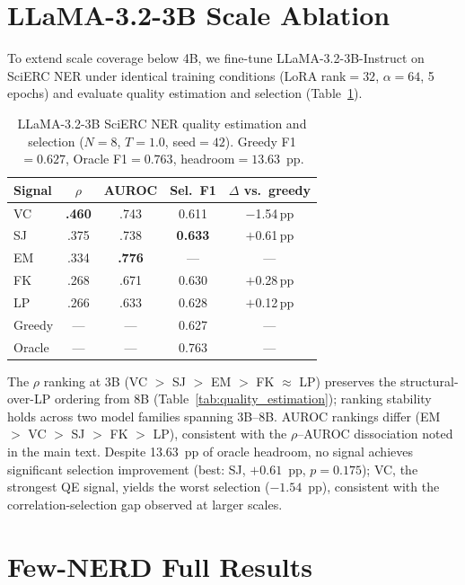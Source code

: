 \section{LLaMA-3.2-3B Scale Ablation}\label{app:llama3b}

To extend scale coverage below 4B, we fine-tune LLaMA-3.2-3B-Instruct on SciERC NER under identical training conditions (LoRA rank${=}32$, $\alpha{=}64$, 5 epochs) and evaluate quality estimation and selection (Table~\ref{tab:llama3b}).

\begin{table}[t]
\centering
\small
\caption{LLaMA-3.2-3B SciERC NER quality estimation and selection ($N{=}8$, $T{=}1.0$, seed${=}42$). Greedy F1${=}0.627$, Oracle F1${=}0.763$, headroom${=}13.63$~pp.}
\label{tab:llama3b}
\begin{tabular}{l cc cc}
\toprule
Signal & $\rho$ & AUROC & Sel.\ F1 & $\Delta$ vs.\ greedy \\
\midrule
VC & \textbf{.460} & .743 & 0.611 & $-$1.54\,pp \\
SJ & .375 & .738 & \textbf{0.633} & $+$0.61\,pp \\
EM & .334 & \textbf{.776} & --- & --- \\
FK & .268 & .671 & 0.630 & $+$0.28\,pp \\
LP & .266 & .633 & 0.628 & $+$0.12\,pp \\
\midrule
Greedy & --- & --- & 0.627 & --- \\
Oracle & --- & --- & 0.763 & --- \\
\bottomrule
\end{tabular}
\end{table}

The $\rho$ ranking at 3B (VC $>$ SJ $>$ EM $>$ FK $\approx$ LP) preserves the structural-over-LP ordering from 8B (Table~\ref{tab:quality_estimation}); ranking stability holds across two model families spanning 3B--8B.
AUROC rankings differ (EM $>$ VC $>$ SJ $>$ FK $>$ LP), consistent with the $\rho$--AUROC dissociation noted in the main text.
Despite 13.63~pp of oracle headroom, no signal achieves significant selection improvement (best: SJ, $+0.61$~pp, $p{=}0.175$); VC, the strongest QE signal, yields the worst selection ($-1.54$~pp), consistent with the correlation-selection gap observed at larger scales.

\section{Few-NERD Full Results}\label{app:fewnerd}

